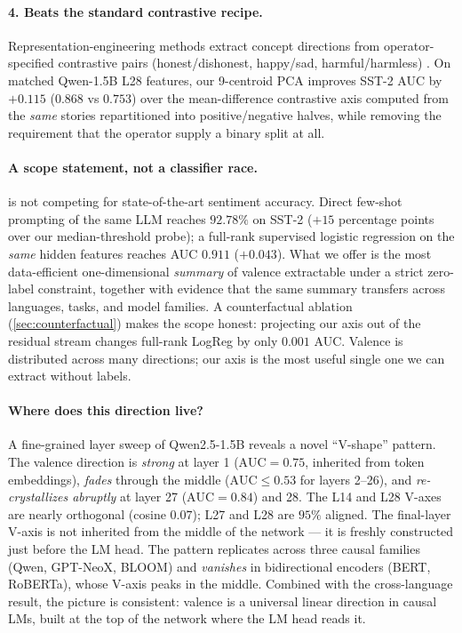 \paragraph{4. Beats the standard contrastive recipe.}
Representation-engineering methods extract concept directions from
operator-specified contrastive pairs (honest/dishonest, happy/sad,
harmful/harmless)
\cite{zou2023representation, rimsky2024steering, arditi2024refusal}. On
matched Qwen-1.5B L28 features, our 9-centroid PCA improves SST-2 AUC
by $+0.115$ ($0.868$ vs $0.753$) over the mean-difference contrastive
axis computed from the \emph{same} stories repartitioned into
positive/negative halves, while removing the requirement that the
operator supply a binary split at all.

\paragraph{A scope statement, not a classifier race.}
\ours{} is not competing for state-of-the-art sentiment accuracy. Direct
few-shot prompting of the same LLM reaches $92.78\%$ on SST-2 ($+15$
percentage points over our median-threshold probe); a full-rank
supervised logistic regression on the \emph{same} hidden features
reaches AUC $0.911$ ($+0.043$). What we offer is the most data-efficient
one-dimensional \emph{summary} of valence extractable under a strict
zero-label constraint, together with evidence that the same summary
transfers across languages, tasks, and model families. A
counterfactual ablation (\cref{sec:counterfactual}) makes the scope
honest: projecting our axis out of the residual stream changes full-rank
LogReg by only $0.001$ AUC. Valence is distributed across many
directions; our axis is the most useful single one we can extract
without labels.

\paragraph{Where does this direction live?}
A fine-grained layer sweep of Qwen2.5-1.5B reveals a novel ``V-shape''
pattern. The valence direction is \emph{strong} at layer 1
($\mathrm{AUC}\!=\!0.75$, inherited from token embeddings), \emph{fades}
through the middle ($\mathrm{AUC}\!\leq\!0.53$ for layers 2--26), and
\emph{re-crystallizes abruptly} at layer 27 ($\mathrm{AUC}\!=\!0.84$)
and 28. The L14 and L28 V-axes are nearly orthogonal (cosine $0.07$);
L27 and L28 are $95\%$ aligned. The final-layer V-axis is not inherited
from the middle of the network --- it is freshly constructed just before
the LM head. The pattern replicates across three causal families (Qwen,
GPT-NeoX, BLOOM) and \emph{vanishes} in bidirectional encoders (BERT,
RoBERTa), whose V-axis peaks in the middle. Combined with the
cross-language result, the picture is consistent: valence is a
universal linear direction in causal LMs, built at the top of the
network where the LM head reads it.

